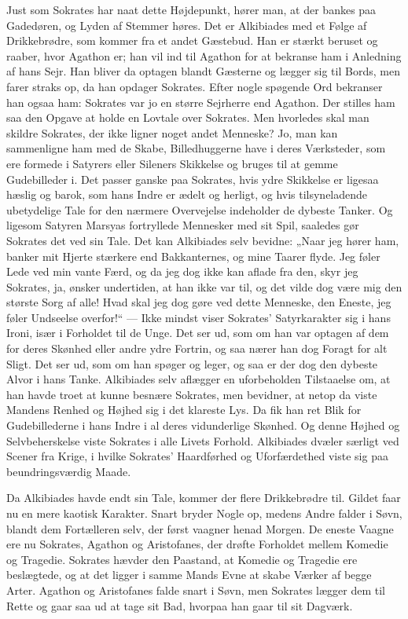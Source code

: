 \documentclass[12pt,a4paper,openany]{book}
\newcommand{\opage}[1]{\marginnote{\footnotesize\textit{[#1]}}}
\begin{document}
Just som Sokrates har naat dette Højdepunkt, hører man,
at der bankes paa Gadedøren, og Lyden af Stemmer høres. Det
er Alkibiades med et Følge af Drikkebrødre, som kommer fra
et andet Gæstebud. Han er stærkt beruset og raaber, hvor Agathon
er; han vil ind til Agathon for at bekranse ham i Anledning
af hans Sejr. Han bliver da optagen blandt Gæsterne og
lægger sig til Bords, men farer straks op, da han opdager Sokrates.
Efter nogle spøgende Ord bekranser han ogsaa ham:
Sokrates var jo en større Sejrherre end Agathon. Der stilles ham
saa den Opgave at holde en Lovtale over Sokrates. Men hvorledes
skal man skildre Sokrates, der ikke ligner noget andet
Menneske? Jo, man kan sammenligne ham med de Skabe, Billedhuggerne
have i deres Værksteder, som ere formede i Satyrers
eller Sileners Skikkelse og bruges til at gemme Gudebilleder i.
Det passer ganske paa Sokrates, hvis ydre Skikkelse er ligesaa
hæslig og barok, som hans Indre er ædelt og herligt, og hvis
tilsyneladende ubetydelige Tale for den nærmere Overvejelse
indeholder de dybeste Tanker. Og ligesom Satyren Marsyas fortryllede
Mennesker med sit Spil, saaledes gør Sokrates det ved
sin Tale. Det kan Alkibiades selv bevidne: „Naar jeg hører ham,
banker mit Hjerte stærkere end Bakkanternes, og mine Taarer
flyde. Jeg føler Lede ved min vante Færd, og da jeg dog ikke
kan aflade fra den, skyr jeg Sokrates, ja, ønsker undertiden, at
han ikke var til, og det vilde dog være mig den største Sorg
af alle! Hvad skal jeg dog gøre ved dette Menneske, den Eneste,
jeg føler Undseelse overfor!“ --- Ikke mindst viser Sokrates’
Satyrkarakter sig i hans Ironi, især i Forholdet til de Unge.
Det ser ud, som om han var optagen af dem for deres Skønhed
eller andre ydre Fortrin, og saa nærer han dog Foragt for alt
Sligt. Det ser ud, som om han spøger og leger, og saa er der
\setcounter{footnote}{0}%
\opage{88}dog den dybeste Alvor i hans Tanke. Alkibiades selv aflægger
en uforbeholden Tilstaaelse om, at han havde troet at kunne
besnære Sokrates, men bevidner, at netop da viste Mandens
Renhed og Højhed sig i det klareste Lys. Da fik han ret Blik
for Gudebillederne i hans Indre i al deres vidunderlige Skønhed.
Og denne Højhed og Selvbeherskelse viste Sokrates i alle Livets
Forhold. Alkibiades dvæler særligt ved Scener fra Krige, i
hvilke Sokrates’ Haardførhed og Uforfærdethed viste sig paa
beundringsværdig Maade.

Da Alkibiades havde endt sin Tale, kommer der flere Drikkebrødre
til. Gildet faar nu en mere kaotisk Karakter. Snart bryder
Nogle op, medens Andre falder i Søvn, blandt dem Fortælleren
selv, der først vaagner henad Morgen. De eneste Vaagne ere nu
Sokrates, Agathon og Aristofanes, der drøfte Forholdet mellem
Komedie og Tragedie. Sokrates hævder den Paastand, at Komedie
og Tragedie ere beslægtede, og at det ligger i samme Mands Evne
at skabe Værker af begge Arter. Agathon og Aristofanes falde
snart i Søvn, men Sokrates lægger dem til Rette og gaar saa
ud at tage sit Bad, hvorpaa han gaar til sit Dagværk.
\end{document}
